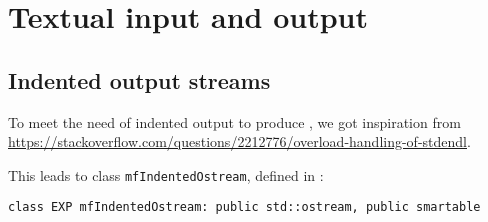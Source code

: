 



\chapter{Textual input and output}



\section{Indented output streams}

To meet the need of indented output to produce , we got inspiration from \url{https://stackoverflow.com/questions/2212776/overload-handling-of-stdendl}.

This leads to class   {\tt mfIndentedOstream}, defined in :
\begin{lstlisting}[language=CPlusPlus]
class EXP mfIndentedOstream: public std::ostream, public smartable
\end{lstlisting}

